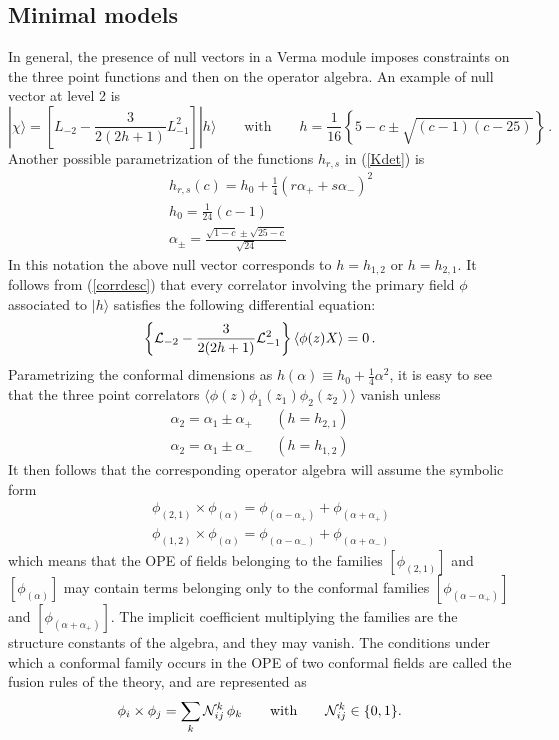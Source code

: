 \documentclass[a4paper,12pt]{report}
\begin{document}
\subsection{Minimal models}

In general, the presence of null vectors in a Verma module imposes constraints on the three point functions and
then on the operator algebra. An example of null vector at level 2 is
\begin{equation}\label{nullvect}
|\chi\rangle=\left[L_{-2}-\frac{3}{2(2h+1)}L_{-1}^{2}\right]|h\rangle \qquad\textrm{with}\qquad
h=\frac{1}{16}\left\{5-c\pm\sqrt{(c-1)(c-25)}\right\} \,.
\end{equation}
Another possible parametrization of the functions $h_{r,s}$ in (\ref{Kdet}) is
\begin{eqnarray}\label{hrs2}
&& h_{r,s}(c)=h_{0}+\frac{1}{4}(r\alpha_{+}+s\alpha_{-})^{2}\\
&& h_{0}=\frac{1}{24}(c-1)\\
&& \alpha_{\pm}=\frac{\sqrt{1-c}\pm\sqrt{25-c}}{\sqrt{24}}
\end{eqnarray}
In this notation the above null vector corresponds to $h=h_{1,2}$ or $h=h_{2,1}$. It follows from
(\ref{corrdesc}) that every correlator involving the primary field $\phi$ associated to $|h\rangle$ satisfies the
following differential equation:
\begin{equation}
\left\{{\cal L}_{-2}-\frac{3}{2(2h+1)}{\cal L}_{-1}^{2}\right\}\langle\phi(z)X\rangle=0\,.
\end{equation}
Parametrizing the conformal dimensions as $h(\alpha)\equiv h_{0}+\frac{1}{4}\alpha^{2}$, it is easy to see that
the three point correlators $\langle\phi(z)\phi_{1}(z_{1})\phi_{2}(z_{2})\rangle$ vanish unless
\begin{eqnarray}
\alpha_{2}=\alpha_{1}\pm \alpha_{+} && (h=h_{2,1}) \\
\alpha_{2}=\alpha_{1}\pm \alpha_{-} && (h=h_{1,2})
\end{eqnarray}
It then follows that the corresponding operator algebra will assume the symbolic form
\begin{eqnarray}
\label{21OPE} && \phi_{(2,1)}\times\phi_{(\alpha)}=\phi_{(\alpha-\alpha_{+})}+\phi_{(\alpha+\alpha_{+})} \\
\label{12OPE} && \phi_{(1,2)}\times\phi_{(\alpha)}=\phi_{(\alpha-\alpha_{-})}+\phi_{(\alpha+\alpha_{-})}
\end{eqnarray}
which means that the OPE of fields belonging to the families $\left[\phi_{(2,1)}\right]$ and
$\left[\phi_{(\alpha)}\right]$ may contain terms belonging only to the conformal families
$\left[\phi_{(\alpha-\alpha_{+})}\right]$ and $\left[\phi_{(\alpha+\alpha_{+})}\right]$. The implicit coefficient
multiplying the families are the structure constants of the algebra, and they may vanish. The conditions under
which a conformal family occurs in the OPE of two conformal fields are called the fusion rules of the theory, and
are represented as
\begin{equation}\label{fusion}
\phi_{i}\times\phi_{j}=\sum_{k}{\cal N}_{ij}^{k}\,\phi_{k} \qquad\textrm{with}\qquad {\cal N}_{ij}^{k}\in\{0,1\}.
\end{equation}
\end{document}
